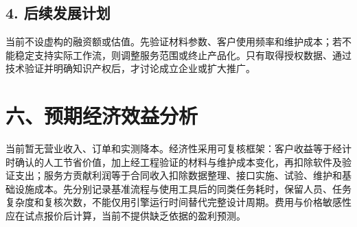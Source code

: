 \documentclass[UTF8,fontset=none,zihao=-4,a4paper]{ctexart}
\begin{document}
\subsection*{4. 后续发展计划}
当前不设虚构的融资额或估值。先验证材料参数、客户使用频率和维护成本；若不能稳定支持实际工作流，则调整服务范围或终止产品化。只有取得授权数据、通过技术验证并明确知识产权后，才讨论成立企业或扩大推广。

\section*{六、预期经济效益分析}
当前暂无营业收入、订单和实测降本。经济性采用可复核框架：客户收益等于经计时确认的人工节省价值，加上经工程验证的材料与维护成本变化，再扣除软件及验证支出；服务方贡献利润等于合同收入扣除数据整理、接口实施、试验、维护和基础设施成本。先分别记录基准流程与使用工具后的同类任务耗时，保留人员、任务复杂度和复核次数，不能仅用引擎运行时间替代完整设计周期。费用与价格敏感性应在试点报价后计算，当前不提供缺乏依据的盈利预测。
\end{document}

